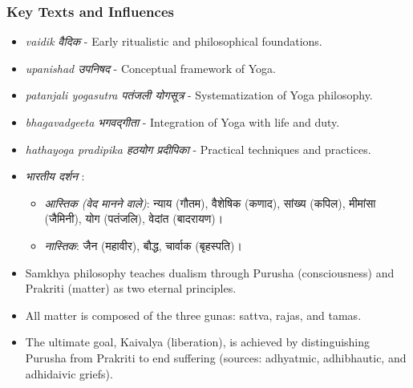 \begin{frame}[fragile]\frametitle{Key Texts and Influences}

      \begin{itemize}
		\item \textit{vaidik वैदिक} - Early ritualistic and philosophical foundations.
		\item \textit{upanishad उपनिषद } - Conceptual framework of Yoga.
		\item \textit{patanjali yogasutra पतंजली योगसूत्र} - Systematization of Yoga philosophy.
		\item \textit{bhagavadgeeta भगवद्गीता} - Integration of Yoga with life and duty.
		\item \textit{hathayoga pradipika हठयोग प्रदीपिका } - Practical techniques and practices.
		\item \textit{भारतीय दर्शन} :
			\begin{itemize}
			\item \textit{आस्तिक (वेद मानने वाले)}: न्याय (गौतम), वैशेषिक (कणाद), सांख्य (कपिल), मीमांसा (जैमिनी), योग (पतंजलि), वेदांत (बादरायण)।
			\item \textit{नास्तिक}: जैन (महावीर), बौद्ध, चार्वाक (बृहस्पति)।
		    \end{itemize}
	    \item Samkhya philosophy teaches dualism through Purusha (consciousness) and Prakriti (matter) as two eternal principles.
	    \item All matter is composed of the three gunas: sattva, rajas, and tamas.
	    \item The ultimate goal, Kaivalya (liberation), is achieved by distinguishing Purusha from Prakriti to end suffering (sources: adhyatmic, adhibhautic, and adhidaivic griefs).
	  \end{itemize}

\end{frame}

